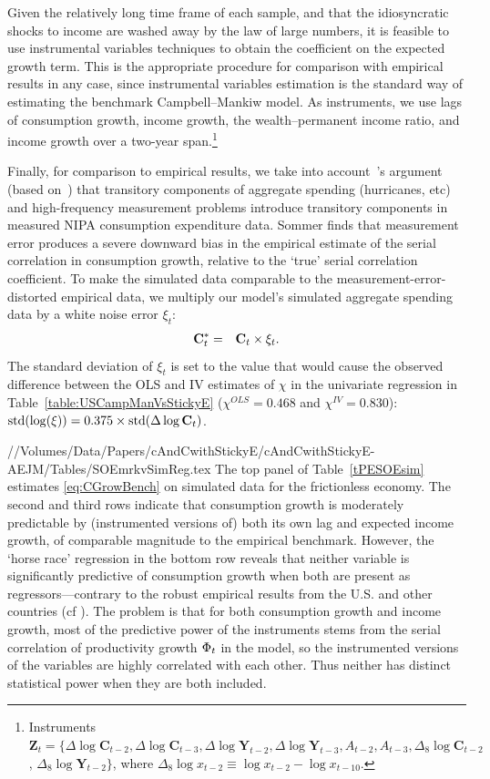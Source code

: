 \documentclass[titlepage]{./econtex}
\begin{document}
Given the relatively long time frame of each sample, and that the idiosyncratic shocks to income are washed away by the law of large numbers, it is feasible to use instrumental variables techniques to obtain the coefficient on the expected growth term.  This is the appropriate procedure for comparison with empirical results in any case, since instrumental variables estimation is the standard way of estimating the benchmark Campbell--Mankiw model.  As instruments, we use lags of consumption growth, income growth, the wealth--permanent income ratio, and income growth over a two-year span.\footnote{Instruments $\textbf{Z}_t = \{\Delta \log \mathbf{C}_{t-2}, \Delta \log \mathbf{C}_{t-3}, \Delta \log \mathbf{Y}_{t-2}, \Delta \log \mathbf{Y}_{t-3}, A_{t-2}, A_{t-3}, \Delta_8 \log \mathbf{C}_{t-2}$, $\Delta_8 \log \mathbf{Y}_{t-2} \}$, where $\Delta_8 \log x_{t-2}\equiv \log x_{t-2}-\log x_{t-10}$.}

Finally, for comparison to empirical results, we take into account~\cite{som07}'s argument (based on~\cite{wilcox:aer}) that transitory components of aggregate spending (hurricanes, etc) and high-frequency measurement problems introduce transitory components in measured NIPA consumption expenditure data.  Sommer finds that measurement error produces a severe downward bias in the empirical estimate of the serial correlation in consumption growth, relative to the `true' serial correlation coefficient.  To make the simulated data comparable to the measurement-error-distorted empirical data, we multiply our model's simulated aggregate spending data by a white noise error $\xi_t$:
\begin{eqnarray*}
	{\mathbf{C}}^*_{t} & = & \mathbf{C}_{t}\times\xi_{t}.
\end{eqnarray*}
The standard deviation of $\xi_t$ is set to the value that would cause the observed difference between the OLS and IV estimates of $\chi$ in the univariate regression in Table~\ref{table:USCampManVsStickyE} ($\chi^{OLS}=0.468$ and $\chi^{IV}=0.830$): $\operatorname{std}(\log(\xi))= 0.375\times\operatorname{std}(\Delta \log \mathbf{C}_t)$.

//Volumes/Data/Papers/cAndCwithStickyE/cAndCwithStickyE-AEJM/Tables/SOEmrkvSimReg.tex
The top panel of Table~\ref{tPESOEsim} estimates \eqref{eq:CGrowBench} on simulated data for the frictionless economy.  The second and third rows indicate that consumption growth is moderately predictable by (instrumented versions of) both its own lag and expected income growth, of comparable magnitude to the empirical benchmark.  However, the `horse race' regression in the bottom row reveals that neither variable is significantly predictive of consumption growth when both are present as regressors---contrary to the robust empirical results from the U.S. and other countries (cf \cite{cssIntlStickyC}).  The problem is that for both consumption growth and income growth, most of the predictive power of the instruments stems from the serial correlation of productivity growth $\Phi_t$ in the model, so the instrumented versions of the variables are highly correlated with each other.  Thus neither has distinct statistical power when they are both included.
\end{document}
